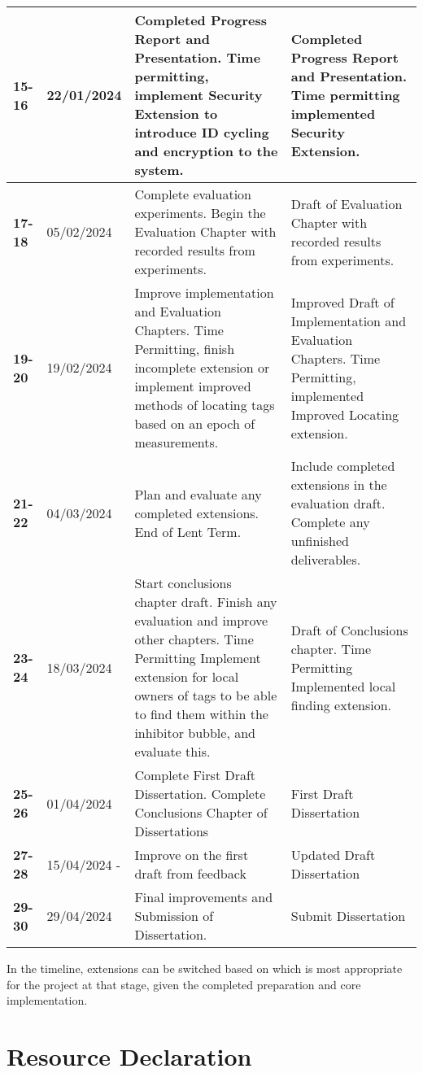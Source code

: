\documentclass{article}
\begin{document}
\begin{table}[!ht]
\begin{tabular}{|l|l|p{7cm}|p{7cm}|}
\textbf{15-16} & 22/01/2024 & Completed Progress Report and Presentation. Time permitting, implement Security Extension to introduce ID cycling and encryption to the system. & Completed Progress Report and Presentation. Time permitting implemented Security Extension. \\ \hline
\textbf{17-18} & 05/02/2024 & Complete evaluation experiments. Begin the Evaluation Chapter with recorded results from experiments. & Draft of Evaluation Chapter with recorded results from experiments. \\ \hline
\textbf{19-20} & 19/02/2024 & Improve implementation and Evaluation Chapters. Time Permitting, finish incomplete extension or implement improved methods of locating tags based on an epoch of measurements. & Improved Draft of Implementation and Evaluation Chapters. Time Permitting, implemented Improved Locating extension. \\ \hline
\textbf{21-22} & 04/03/2024 & Plan and evaluate any completed extensions. End of Lent Term. & Include completed extensions in the evaluation draft. Complete any unfinished deliverables. \\ \hline
\textbf{23-24} & 18/03/2024 & Start conclusions chapter draft. Finish any evaluation and improve other chapters. Time Permitting Implement extension for local owners of tags to be able to find them within the inhibitor bubble, and evaluate this. & Draft of Conclusions chapter. Time Permitting Implemented local finding extension. \\ \hline
\textbf{25-26} & 01/04/2024 & Complete First Draft Dissertation. Complete Conclusions Chapter of Dissertations & First Draft Dissertation \\ \hline
\textbf{27-28} & 15/04/2024 - & Improve on the first draft from feedback & Updated Draft Dissertation \\ \hline
\textbf{29-30} & 29/04/2024 & Final improvements and Submission of Dissertation. & Submit Dissertation \\ \hline
\end{tabular}
\end{table}
\pagebreak
In the timeline, extensions can be switched based on which is most appropriate for the project at that stage, given the completed preparation and core implementation.


\section{Resource Declaration}
\end{document}
